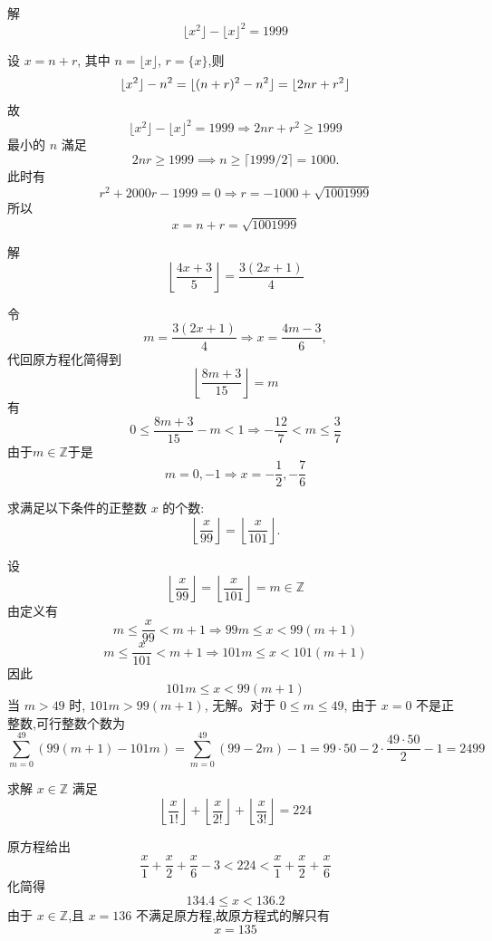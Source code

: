 \begin{questions}
    \question 解
    \[
    \lfloor x^2 \rfloor - \lfloor x \rfloor^2 = 1999
    \]
    \begin{solution}
        设 $x = n + r$, 其中 $n = \lfloor x \rfloor$, $r = \{x\}$,则
        \[
        \lfloor x^2 \rfloor - n^2 = \lfloor(n+r)^2-n^2\rfloor =\lfloor 2 n r + r^2 \rfloor
        \]
        故
        \[
        \lfloor x^2 \rfloor - \lfloor x \rfloor^2 = 1999 \Rightarrow 2 n r + r^2 \ge 1999
        \]
        最小的 $n$ 滿足
        \[
        2n r \ge 1999 \implies n \ge \lceil 1999/2 \rceil = 1000.
        \]
        此时有
        \[
        r^2 + 2000 r - 1999 = 0 \Rightarrow r = -1000 + \sqrt{1001999}
        \]
        所以
        \[
        x = n + r = \sqrt{1001999}
        \]
    \end{solution}

    \question 解 
    \[
    \left \lfloor \frac{4x+3}{5} \right \rfloor = \frac{3(2x+1)}{4}
    \]    
    \begin{solution}
        令 
        \[
        m = \frac{3(2x+1)}{4} \Rightarrow x = \frac{4m-3}{6},
        \]
        代回原方程化简得到 
        \[ 
        \left \lfloor \frac{8m+3}{15} \right \rfloor= m 
        \]
        有 
        \[
        0 \le \frac{8m+3}{15} - m < 1  \Rightarrow -\frac{12}{7} < m \le \frac{3}{7} 
        \]
        由于$m \in \mathbb{Z}$于是
        \[ 
        m = 0, -1 \Rightarrow x = -\frac{1}{2}, -\frac{7}{6}
        \]
    \end{solution}

    \question 求满足以下条件的正整数 $x$ 的个数:
    \[
    \left\lfloor \frac{x}{99} \right\rfloor = \left\lfloor \frac{x}{101} \right\rfloor.
    \]
    \begin{solution}
        设
        \[
        \left\lfloor \frac{x}{99} \right\rfloor = \left\lfloor \frac{x}{101} \right\rfloor = m \in \mathbb{Z}
        \]
        由定义有
        \[
        m \le \frac{x}{99} < m+1 \Rightarrow 99m \le x < 99(m+1)
        \]
        \[
        m \le \frac{x}{101} < m+1 \Rightarrow 101m \le x < 101(m+1)
        \]
        因此
        \[
        101m \le x < 99(m+1)
        \]
        当 $m>49$ 时, $101m > 99(m+1)$, 无解。对于 $0 \le m \le 49$, 由于 $x=0$ 不是正整数,可行整数个数为
        \[
        \sum_{m=0}^{49} (99(m+1)-101m) =\sum_{m=0}^{49} (99-2m) -1 = 99 \cdot 50 - 2 \cdot \frac{49 \cdot 50}{2} -1 = 2499
        \]
    \end{solution}

    \question 求解 $x\in \mathbb{Z}$ 满足
    \[
    \left\lfloor \frac{x}{1!} \right\rfloor + \left\lfloor \frac{x}{2!} \right\rfloor + \left\lfloor \frac{x}{3!} \right\rfloor = 224
    \]
    \begin{solution}
        原方程给出
        \[
        \frac{x}{1} + \frac{x}{2} + \frac{x}{6} -3 < 224 < \frac{x}{1} + \frac{x}{2} + \frac{x}{6}
        \]
        化简得
        \[
        134.4 \le x < 136.2
        \]
        由于 $x \in \mathbb{Z}$,且 $x=136$ 不满足原方程,故原方程式的解只有
        \[
        x = 135
        \]
    \end{solution}


\end{questions}
